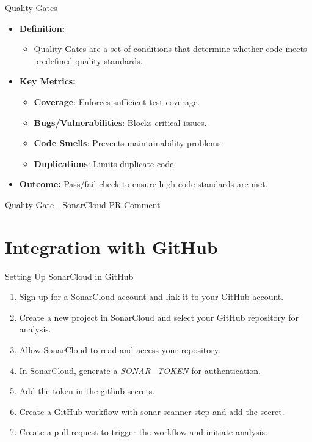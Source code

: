 \documentclass{beamer}
\begin{document}
\begin{frame}{Quality Gates}
  \begin{itemize}
    \item \textbf{Definition:}
    \begin{itemize}
      \item Quality Gates are a set of conditions that determine whether code meets predefined quality standards.
    \end{itemize}

    \vspace*{1em}

    \item \textbf{Key Metrics:}
    \begin{itemize}
        \item \textbf{Coverage}: Enforces sufficient test coverage.
        \item \textbf{Bugs/Vulnerabilities}: Blocks critical issues.
        \item \textbf{Code Smells}: Prevents maintainability problems.
        \item \textbf{Duplications}: Limits duplicate code.
    \end{itemize}
    
    \vspace*{1em}

    \item \textbf{Outcome:}
    Pass/fail check to ensure high code standards are met.
  \end{itemize}
\end{frame}

\begin{frame}{Quality Gate - SonarCloud PR Comment}
\end{frame}

\section[ Integration with GitHub]{Integration with GitHub}

\begin{frame}{Setting Up SonarCloud in GitHub}
  
  \begin{enumerate}
    \item Sign up for a SonarCloud account and link it to your GitHub account.
    \item Create a new project in SonarCloud and select your GitHub repository for analysis.
    \item Allow SonarCloud to read and access your repository.
    \item In SonarCloud, generate a \small{\textit{SONAR\_TOKEN}} \normalsize for authentication.
    \item Add the token in the github secrets.
    \item Create a GitHub workflow with sonar-scanner step and add the secret.
    \item Create a pull request to trigger the workflow and initiate analysis.
  \end{enumerate}

\end{frame}
\end{document}
